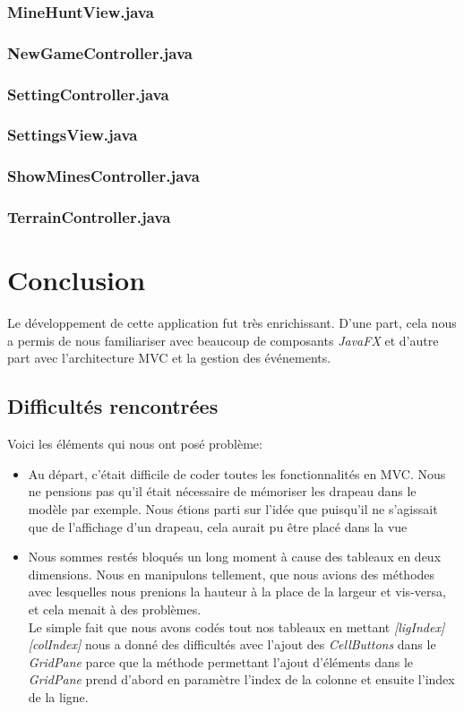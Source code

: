 \documentclass[a4paper, 10pt]{article}
\begin{document}
\subsubsection{MineHuntView.java}

\subsubsection{NewGameController.java}

\subsubsection{SettingController.java}

\subsubsection{SettingsView.java}

\subsubsection{ShowMinesController.java}

\subsubsection{TerrainController.java}

\section{Conclusion}
Le développement de cette application fut très enrichissant. D'une part, cela nous a permis de nous familiariser avec beaucoup de composants \emph{JavaFX} et d'autre part avec l'architecture MVC et la gestion des événements.
\subsection{Difficultés rencontrées}
Voici les éléments qui nous ont posé problème:
\begin{itemize}
\item Au départ, c'était difficile de coder toutes les fonctionnalités en MVC. Nous ne pensions pas qu'il était nécessaire de mémoriser les drapeau dans le modèle par exemple. Nous étions parti sur l'idée que puisqu'il ne s'agissait que de l'affichage d'un drapeau, cela aurait pu être placé dans la vue
\item Nous sommes restés bloqués un long moment à cause des tableaux en deux dimensions. Nous en manipulons tellement, que nous avions des méthodes avec lesquelles nous prenions la hauteur à la place de la largeur et vis-versa, et cela menait à des problèmes.\\
Le simple fait que nous avons codés tout nos tableaux en mettant \emph{[ligIndex][colIndex]} nous a donné des difficultés avec l'ajout des \emph{CellButtons} dans le \emph{GridPane} parce que la méthode permettant l'ajout d'éléments dans le \emph{GridPane} prend d'abord en paramètre l'index de la colonne et ensuite l'index de la ligne. 
\end{itemize}
\end{document}
